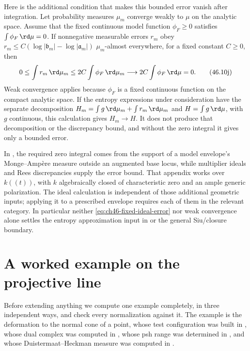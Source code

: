 Here is the additional condition that makes this bounded error vanish
after integration. Let probability measures $\mu_m$ converge weakly
to $\mu$ on the analytic space. Assume that the fixed continuous
model function $\phi_F\geq0$ satisfies
$\int\phi_F\,\rd\mu=0$. If nonnegative measurable errors $r_m$ obey
$r_m\leq C(\log|\mathfrak b_m|-\log|\mathfrak a_m|)$
$\mu_m$-almost everywhere, for a fixed constant $C\geq0$, then
\[
 0\leq\int r_m\,\rd\mu_m
 \leq2C\int\phi_F\,\rd\mu_m
 \longrightarrow2C\int\phi_F\,\rd\mu=0.
\tag{46.10j}\label{eq:ch46-integrated-ideal-error}
\]
Weak convergence applies because $\phi_F$ is a fixed continuous
function on the compact analytic space. If the entropy expressions
under consideration have the separate decomposition
$H_m=\int g\,\rd\mu_m+\int r_m\,\rd\mu_m$ and
$H=\int g\,\rd\mu$, with $g$ continuous, this calculation gives
$H_m\to H$. It does not produce that decomposition or the discrepancy
bound, and without the zero integral it gives only a bounded error.

In \cite[Proposition~A.6]{Trusiani26}, the required zero integral
comes from the support of a model envelope's Monge--Amp\`ere measure
outside an augmented base locus, while multiplier ideals and Rees
discrepancies supply the error bound. That appendix works over
$k((t))$, with $k$ algebraically closed of characteristic zero and
an ample generic polarization. The ideal calculation is independent
of those additional geometric inputs; applying it to a prescribed
envelope requires each of them in the relevant category. In particular
neither \eqref{eq:ch46-fixed-ideal-error} nor weak convergence alone
settles the entropy approximation input in
 or the general Siu/closure boundary.

\section{A worked example on the projective line}
\label{sec:ch46-p1}

Before extending anything we compute one example completely, in three
independent ways, and check every normalization against it.  The example is
the deformation to the normal cone of a point, whose test configuration was
built in , whose dual complex was
computed in , whose psh range was
determined in , and whose Duistermaat--Heckman
measure was computed in .

